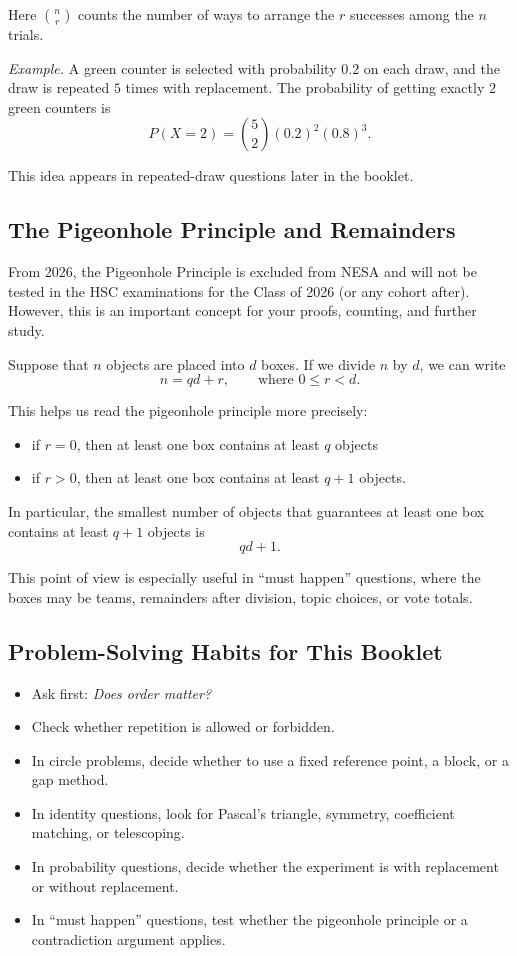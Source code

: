 \documentclass[12pt]{article}
\newenvironment{remark}[1][]{%
  \begin{remarkbox}[title={\bfseries Remark~\thetcbcounter\ifx\relax#1\relax\else\ (#1)\fi}]%
}{%
  \end{remarkbox}%
}
\begin{document}
Here $\binom{n}{r}$ counts the number of ways to arrange the $r$ successes among the $n$ trials.

\textit{Example.} A green counter is selected with probability $0.2$ on each draw, and the draw is repeated $5$ times with replacement. The probability of getting exactly $2$ green counters is
\[
P(X=2)=\binom{5}{2}(0.2)^2(0.8)^3.
\]

This idea appears in repeated-draw questions later in the booklet.

\subsection{The Pigeonhole Principle and Remainders}
\begin{remark}[Syllabus Note]
From 2026, the Pigeonhole Principle is excluded from NESA and will not be tested in the HSC examinations for the Class of 2026 (or any cohort after). However, this is an important concept for your proofs, counting, and further study.
\end{remark}

Suppose that $n$ objects are placed into $d$ boxes. If we divide $n$ by $d$, we can write
\[
n=qd+r,
\qquad \text{where } 0\le r<d.
\]

This helps us read the pigeonhole principle more precisely:
\begin{itemize}[leftmargin=*]
  \item if $r=0$, then at least one box contains at least $q$ objects
  \item if $r>0$, then at least one box contains at least $q+1$ objects.
\end{itemize}

In particular, the smallest number of objects that guarantees at least one box contains at least $q+1$ objects is
\[
qd+1.
\]

This point of view is especially useful in ``must happen'' questions, where the boxes may be teams, remainders after division, topic choices, or vote totals.

\subsection{Problem-Solving Habits for This Booklet}
\begin{itemize}[leftmargin=*]
  \item Ask first: \emph{Does order matter?}
  \item Check whether repetition is allowed or forbidden.
  \item In circle problems, decide whether to use a fixed reference point, a block, or a gap method.
  \item In identity questions, look for Pascal's triangle, symmetry, coefficient matching, or telescoping.
  \item In probability questions, decide whether the experiment is with replacement or without replacement.
  \item In ``must happen'' questions, test whether the pigeonhole principle or a contradiction argument applies.
\end{itemize}
\end{document}
